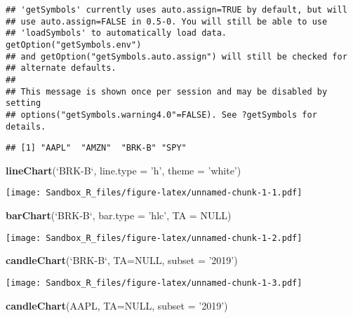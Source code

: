 \documentclass[]{article}
\newenvironment{Shaded}{\begin{snugshade}}{\end{snugshade}}
\newcommand{\KeywordTok}[1]{\textcolor[rgb]{0.13,0.29,0.53}{\textbf{#1}}}
\newcommand{\DataTypeTok}[1]{\textcolor[rgb]{0.13,0.29,0.53}{#1}}
\newcommand{\StringTok}[1]{\textcolor[rgb]{0.31,0.60,0.02}{#1}}
\newcommand{\OtherTok}[1]{\textcolor[rgb]{0.56,0.35,0.01}{#1}}
\newcommand{\NormalTok}[1]{#1}
\begin{document}
\begin{verbatim}
## 'getSymbols' currently uses auto.assign=TRUE by default, but will
## use auto.assign=FALSE in 0.5-0. You will still be able to use
## 'loadSymbols' to automatically load data. getOption("getSymbols.env")
## and getOption("getSymbols.auto.assign") will still be checked for
## alternate defaults.
## 
## This message is shown once per session and may be disabled by setting 
## options("getSymbols.warning4.0"=FALSE). See ?getSymbols for details.
\end{verbatim}

\begin{verbatim}
## [1] "AAPL"  "AMZN"  "BRK-B" "SPY"
\end{verbatim}

\begin{Shaded}
\begin{Highlighting}[]
\KeywordTok{lineChart}\NormalTok{(}\StringTok{`}\DataTypeTok{BRK-B}\StringTok{`}\NormalTok{, }\DataTypeTok{line.type =} \StringTok{'h'}\NormalTok{, }\DataTypeTok{theme =} \StringTok{'white'}\NormalTok{)}
\end{Highlighting}
\end{Shaded}

\texttt{[image: Sandbox\_R\_files/figure-latex/unnamed-chunk-1-1.pdf]}

\begin{Shaded}
\begin{Highlighting}[]
\KeywordTok{barChart}\NormalTok{(}\StringTok{`}\DataTypeTok{BRK-B}\StringTok{`}\NormalTok{, }\DataTypeTok{bar.type =} \StringTok{'hlc'}\NormalTok{, }\DataTypeTok{TA =} \OtherTok{NULL}\NormalTok{)}
\end{Highlighting}
\end{Shaded}

\texttt{[image: Sandbox\_R\_files/figure-latex/unnamed-chunk-1-2.pdf]}

\begin{Shaded}
\begin{Highlighting}[]
\KeywordTok{candleChart}\NormalTok{(}\StringTok{`}\DataTypeTok{BRK-B}\StringTok{`}\NormalTok{, }\DataTypeTok{TA=}\OtherTok{NULL}\NormalTok{, }\DataTypeTok{subset =} \StringTok{'2019'}\NormalTok{)}
\end{Highlighting}
\end{Shaded}

\texttt{[image: Sandbox\_R\_files/figure-latex/unnamed-chunk-1-3.pdf]}

\begin{Shaded}
\begin{Highlighting}[]
\KeywordTok{candleChart}\NormalTok{(AAPL, }\DataTypeTok{TA=}\OtherTok{NULL}\NormalTok{, }\DataTypeTok{subset =} \StringTok{'2019'}\NormalTok{)}
\end{Highlighting}
\end{Shaded}
\end{document}
